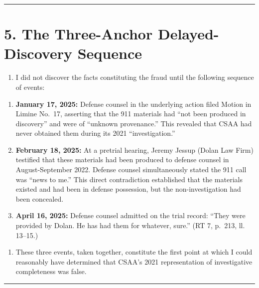 \begin{center}\rule{0.5\linewidth}{0.5pt}\end{center}

\section{5. The Three-Anchor Delayed-Discovery Sequence}\label{the-three-anchor-delayed-discovery-sequence}

\begin{enumerate}
\def\labelenumi{\arabic{enumi}.}
\setcounter{enumi}{10}
\tightlist
\item
  I did not discover the facts constituting the fraud until the following sequence of events:
\end{enumerate}

\begin{enumerate}
\def\labelenumi{(\alph{enumi})}
\item
  \textbf{January 17, 2025:} Defense counsel in the underlying action filed Motion in Limine No.~17, asserting that the 911 materials had ``not been produced in discovery'' and were of ``unknown provenance.'' This revealed that CSAA had never obtained them during its 2021 ``investigation.''
\item
  \textbf{February 18, 2025:} At a pretrial hearing, Jeremy Jessup (Dolan Law Firm) testified that these materials had been produced to defense counsel in August-September 2022. Defense counsel simultaneously stated the 911 call was ``news to me.'' This direct contradiction established that the materials existed and had been in defense possession, but the non-investigation had been concealed.
\item
  \textbf{April 16, 2025:} Defense counsel admitted on the trial record: ``They were provided by Dolan. He has had them for whatever, sure.'' (RT 7, p.~213, ll. 13--15.)
\end{enumerate}

\begin{enumerate}
\def\labelenumi{\arabic{enumi}.}
\setcounter{enumi}{11}
\tightlist
\item
  These three events, taken together, constitute the first point at which I could reasonably have determined that CSAA's 2021 representation of investigative completeness was false.
\end{enumerate}

\begin{center}\rule{0.5\linewidth}{0.5pt}\end{center}

